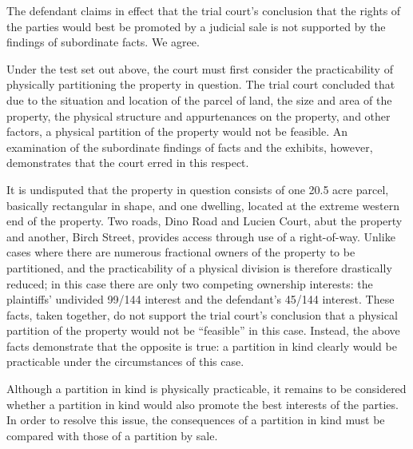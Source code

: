 The defendant claims in effect that the trial court's conclusion that the rights
of the parties would best be promoted by a judicial sale is not supported by
the findings of subordinate facts. We agree.

Under the test set out above, the court must first consider the practicability
of physically partitioning the property in question. The trial court concluded
that due to the situation and location of the parcel of land, the size and area
of the property, the physical structure and appurtenances on the property, and
other factors, a physical partition of the property would not be feasible. An
examination of the subordinate findings of facts and the exhibits, however,
demonstrates that the court erred in this respect.

It is undisputed that the property in question consists of one 20.5 acre parcel,
basically rectangular in shape, and one dwelling, located at the extreme
western end of the property. Two roads, Dino Road and Lucien Court, abut the
property and another, Birch Street, provides access through use of a
right-of-way. Unlike cases where there are numerous fractional owners of the
property to be partitioned, and the practicability of a physical division is
therefore drastically reduced; in this case there are only two competing
ownership interests: the plaintiffs' undivided 99/144 interest and the
defendant's 45/144 interest. These facts, taken together, do not support the
trial court's conclusion that a physical partition of the property would not be
``feasible'' in this case. Instead, the above facts demonstrate that the
opposite is true: a partition in kind clearly would be practicable under the
circumstances of this case.

Although a partition in kind is physically practicable, it remains to be
considered whether a partition in kind would also promote the best interests of
the parties. In order to resolve this issue, the consequences of a partition in
kind must be compared with those of a partition by sale.

